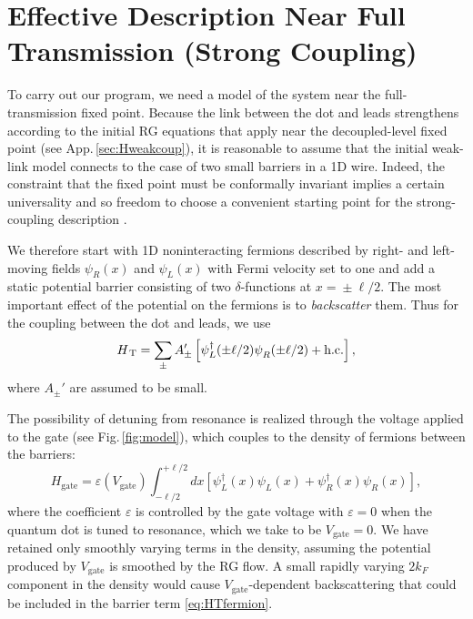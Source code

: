 \documentclass[aps,prb,reprint,floatfix,superscriptaddress,amssymb,amsmath]{revtex4-2}
\newcommand{\phdag}{{\phantom{\dagger}}}
\newcommand{\psiLdag}{\psi^\dagger_L}
\newcommand{\psiL}{\psi^\phdag_L}
\newcommand{\psiRdag}{\psi^\dagger_R}
\newcommand{\psiR}{\psi^\phdag_R}
\newcommand{\HT}{H_\text{\,T}}
\newcommand{\Vg}{V_\text{gate}}
\newcommand{\hub}[1]{\textcolor{red}{#1}}
\begin{document}
\section{Effective Description Near Full Transmission (Strong Coupling)}
\label{sec:strong-coup}

To carry out our program, we need a model of the system near the full-transmission fixed point. Because the link between the dot and leads strengthens according to the initial RG equations that apply near the decoupled-level fixed point (see App.\,\ref{sec:Hweakcoup}), it is reasonable to assume that the initial weak-link model connects to the case of two small barriers in a 1D wire. Indeed, the constraint that the fixed point must be conformally invariant implies a certain universality and so freedom to choose a convenient starting point for the strong-coupling description \cite{AffleckMiniRev94, WongAffleck94, AffleckLesHouches10}. 

We therefore start with 1D noninteracting fermions described by right- and left-moving fields $\psi_R(x)$ and $\psi_L(x)$ with Fermi velocity set to one and add a static potential barrier consisting of two $\delta$-functions at $x \!=\! \pm\ell/2$. 
The most important effect of the potential on the fermions is to \emph{backscatter} them. Thus for the coupling between the dot and leads, we use
\begin{equation}\label{eq:HTfermion}
\HT = \sum_\pm A_\pm' \left[ \psiLdag(\pm\ell/2) \psiR(\pm\ell/2) + 
\text{h.c.}
\right] ,
\end{equation}
where $A_\pm'$ are assumed to be small. 

The possibility of detuning from resonance is realized through the voltage applied to the gate (see Fig.\,\ref{fig:model}), which couples to the density of fermions between the barriers: 
\begin{equation}\label{eq:Hgate1} 
H_\text{gate} = \varepsilon(\Vg) \!\int_{-\ell/2}^{+\ell/2} \!\!\!\!\!\! dx 
\left[ \psiLdag(x) \psiL(x)  + \psiRdag(x) \psiR(x) \right],
\end{equation}
where the coefficient $\varepsilon$ is controlled by the gate voltage with $\varepsilon \!=\! 0$ when the quantum dot is tuned to resonance, which we take to be $\Vg\!=\!0$. We have retained only smoothly varying terms in the density, assuming the potential produced by $\Vg$ is smoothed by the RG flow. 
A small rapidly varying $2k_F$ component in the density would cause $\Vg$-dependent backscattering that could be included in the barrier term \eqref{eq:HTfermion}.
\end{document}
